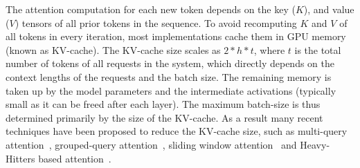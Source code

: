  The attention computation for each new token depends on the key ($K$), and value ($V$) tensors of all prior tokens in the sequence. To avoid recomputing $K$ and $V$ of all tokens in every iteration, most implementations cache them in GPU memory (known as KV-cache). The KV-cache size scales as $2*h*t$, where $t$ is the total number of tokens of all requests in the system, which directly depends on the context lengths of the requests and the batch size. The remaining memory is taken up by the model parameters and the intermediate activations (typically small as it can be freed after each layer). The maximum batch-size is thus determined primarily by the size of the KV-cache. As a result many recent techniques have been proposed to reduce the KV-cache size, such as multi-query attention~\cite{multiqueryattention}, grouped-query attention~\cite{groupedqueryattention}, sliding window attention~\cite{longformer} and Heavy-Hitters based attention~\cite{heavyhitters}.






\begin{table}[t]
\center
{}

\caption{Shapes of the input, weight, and output tensors in a transformer decoder block with iteration-level scheduling. $h$ and $h2$ denote the model's primary and secondary hidden dimensions. $l_i$ denotes the sequence length of $i^{th}$ request in the batch whereas $L$ denotes the input tokens of all requests in the batch. If batch size is $B$, then $L$=$B$ during decode since each request processes one token in a decode iteration.}
\label{table:tensor:shapes}
\end{table}

